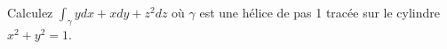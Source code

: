 
\begin{exercice}\label{exoVariete0009}

Calculez $\int_\gamma y dx + x dy  + z^2 dz$ où $\gamma$ est une hélice de pas 1 tracée sur le cylindre $x^2+y^2=1$.

\end{exercice}
